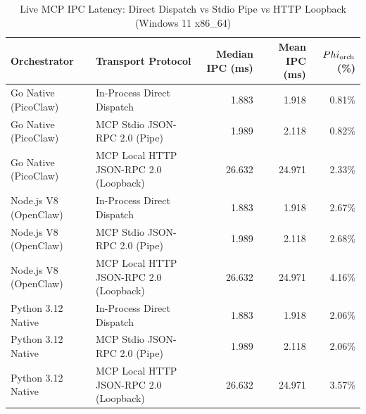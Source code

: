\begin{table}[t]
\centering\small
\caption{Live MCP IPC Latency: Direct Dispatch vs Stdio Pipe vs HTTP Loopback (Windows 11 x86_64)}
\label{tab:Windows_mcp_transport}
\begin{tabular}{llrrr}
\toprule
Orchestrator & Transport Protocol & Median IPC (ms) & Mean IPC (ms) & $\\Phi_{\text{orch}}$ (\%) \\
\midrule
Go Native (PicoClaw) & In-Process Direct Dispatch & 1.883 & 1.918 & 0.81\% \\
Go Native (PicoClaw) & MCP Stdio JSON-RPC 2.0 (Pipe) & 1.989 & 2.118 & 0.82\% \\
Go Native (PicoClaw) & MCP Local HTTP JSON-RPC 2.0 (Loopback) & 26.632 & 24.971 & 2.33\% \\
Node.js V8 (OpenClaw) & In-Process Direct Dispatch & 1.883 & 1.918 & 2.67\% \\
Node.js V8 (OpenClaw) & MCP Stdio JSON-RPC 2.0 (Pipe) & 1.989 & 2.118 & 2.68\% \\
Node.js V8 (OpenClaw) & MCP Local HTTP JSON-RPC 2.0 (Loopback) & 26.632 & 24.971 & 4.16\% \\
Python 3.12 Native & In-Process Direct Dispatch & 1.883 & 1.918 & 2.06\% \\
Python 3.12 Native & MCP Stdio JSON-RPC 2.0 (Pipe) & 1.989 & 2.118 & 2.06\% \\
Python 3.12 Native & MCP Local HTTP JSON-RPC 2.0 (Loopback) & 26.632 & 24.971 & 3.57\% \\
\bottomrule
\end{tabular}
\end{table}

